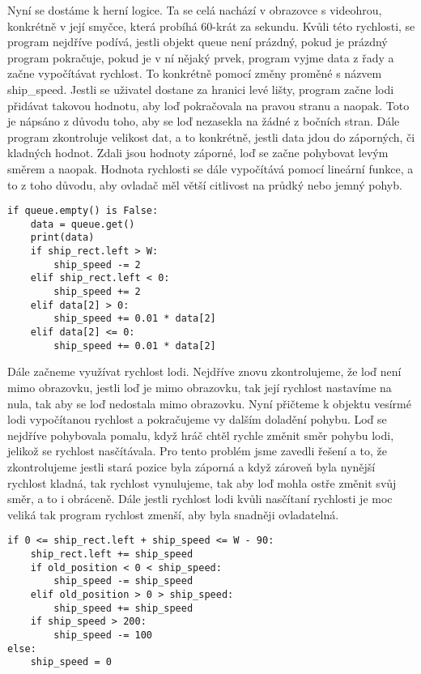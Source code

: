 \documentclass[12pt]{report}			%
\begin{document}
Nyní se dostáme k herní logice. Ta se celá nachází v obrazovce s videohrou, konkrétně v její smyčce, která probíhá 60-krát za sekundu. Kvůli této rychlosti, se program nejdříve podívá, jestli objekt queue není prázdný, pokud je prázdný program pokračuje, pokud je v ní nějaký prvek, program vyjme data z řady a začne vypočítávat rychlost. 
To konkrétně pomocí změny proměné s názvem ship\_speed. Jestli se uživatel dostane za hranici levé lišty, program začne lodi přidávat takovou hodnotu, aby loď pokračovala na pravou stranu a naopak. Toto je nápsáno z důvodu toho, aby se loď nezasekla na žádné z bočních stran. Dále program zkontroluje velikost dat, 
a to konkrétně, jestli data jdou do záporných, či kladných hodnot. Zdali jsou hodnoty záporné, loď se začne pohybovat levým směrem a naopak. Hodnota rychlosti se dále vypočítává pomocí lineární funkce, a to z toho důvodu, aby ovladač měl větší citlivost na průdký nebo jemný pohyb. 



\begin{lstlisting}[title={Program game.py}, caption={game.py}]
if queue.empty() is False:
	data = queue.get()
    print(data)
    if ship_rect.left > W: 
        ship_speed -= 2
    elif ship_rect.left < 0:  
        ship_speed += 2
    elif data[2] > 0:
        ship_speed += 0.01 * data[2] 
    elif data[2] <= 0:
        ship_speed += 0.01 * data[2]

\end{lstlisting}


Dále začneme využívat rychlost lodi. Nejdříve znovu zkontrolujeme, že loď není mimo obrazovku, jestli loď je mimo obrazovku, tak její rychlost nastavíme na nula, tak aby se loď nedostala mimo obrazovku. Nyní přičteme k objektu vesírmé lodi vypočítanou rychlost a pokračujeme vy dalším doladění pohybu. Loď se nejdříve pohybovala pomalu, když hráč chtěl rychle změnit směr pohybu lodi, jelikož se rychlost nasčítávala. Pro tento problém jsme zavedli řešení a to, že zkontrolujeme jestli stará pozice byla záporná a když zároveň byla nynější rychlost kladná, tak rychlost vynulujeme, tak aby loď mohla ostře změnit svůj směr, a to i obráceně. Dále jestli rychlost lodi kvůli nasčítaní rychlosti je moc veliká tak program rychlost zmenší, aby byla snadněji ovladatelná. 



\begin{lstlisting}[title={Program game.py}, caption={game.py}]
if 0 <= ship_rect.left + ship_speed <= W - 90: 
    ship_rect.left += ship_speed
    if old_position < 0 < ship_speed:  
        ship_speed -= ship_speed
    elif old_position > 0 > ship_speed:  
        ship_speed += ship_speed
    if ship_speed > 200:  
        ship_speed -= 100
else:
    ship_speed = 0

\end{lstlisting}
\end{document}
